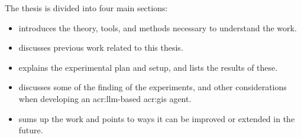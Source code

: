 The thesis is divided into four main sections:
\begin{itemize}
    \item {} introduces the theory, tools, and methods necessary to understand the work.
    \item {} discusses previous work related to this thesis.
    \item {} explains the experimental plan and setup, and lists the results of these.
    \item {} discusses some of the finding of the experiments, and other considerations when developing an \acrshort{acr:llm}-based \acrshort{acr:gis} agent.
    \item {} sums up the work and points to ways it can be improved or extended in the future.
\end{itemize}

\glsresetall